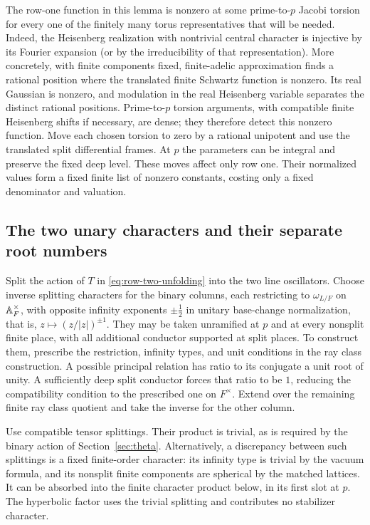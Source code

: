 The row-one function in this lemma is nonzero at some prime-to-$p$
Jacobi torsion for every one of the finitely many torus representatives
that will be needed.  Indeed, the Heisenberg realization with nontrivial
central character is injective by its Fourier expansion (or by the
irreducibility of that representation).  More concretely, with finite
components fixed, finite-adelic approximation finds a rational position
where the translated finite Schwartz function is nonzero.  Its real
Gaussian is nonzero, and modulation in the real Heisenberg variable
separates the distinct rational positions.  Prime-to-$p$ torsion
arguments, with compatible finite Heisenberg shifts if necessary, are
dense; they therefore detect this nonzero function.  Move each chosen
torsion to zero by a rational unipotent and use the translated split
differential frames.  At $p$ the parameters can be integral and preserve
the fixed deep level.  These moves affect only row one.  Their normalized
values form a fixed finite list of nonzero constants, costing only a
fixed denominator and valuation.

\subsection{The two unary characters and their separate root numbers}

Split the action of $T$ in \eqref{eq:row-two-unfolding} into the two
line oscillators.  Choose inverse splitting characters for the binary
columns, each restricting to $\omega_{L/F}$ on $\mathbb A_F^\times$, with
opposite infinity exponents $\pm\frac12$ in unitary base-change
normalization, that is, $z\mapsto(z/|z|)^{\pm1}$.  They may be taken
unramified at $p$ and at every nonsplit finite place, with all additional
conductor supported at split places.  To construct them, prescribe the
restriction, infinity types, and unit conditions in the ray class
construction.  A possible principal relation has ratio to its
conjugate a unit root of unity.  A sufficiently deep split conductor
forces that ratio to be $1$, reducing the compatibility condition to
the prescribed one on $F^\times$.  Extend over the remaining finite ray
class quotient and take the inverse for the other column.

Use compatible tensor splittings.  Their product is trivial, as is
required by the binary action of Section~\ref{sec:theta}.  Alternatively,
a discrepancy between such splittings is a fixed finite-order character:
its infinity type is trivial by the vacuum formula, and its nonsplit
finite components are spherical by the matched lattices.  It can be
absorbed into the finite character product below, in its first slot at
$p$.  The hyperbolic factor uses the trivial splitting and contributes
no stabilizer character.

